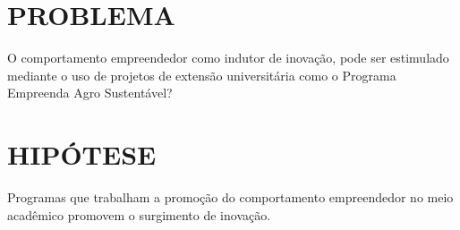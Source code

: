 \section{PROBLEMA}

O comportamento empreendedor como indutor de inovação, pode ser estimulado mediante o uso de projetos de extensão universitária como o Programa Empreenda Agro Sustentável? 


\section{HIPÓTESE}

Programas que trabalham a promoção do comportamento empreendedor no meio acadêmico promovem o surgimento de inovação.








